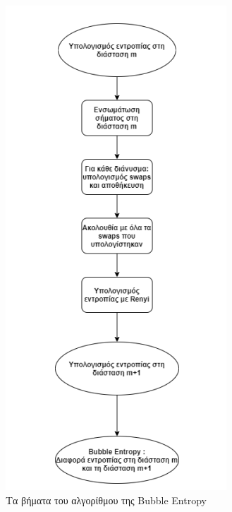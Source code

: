 \begin{figure}[!ht]
	\centering
	\includegraphics[scale = 0.5]{Bubble2.png}    
	\caption{Τα βήματα του αλγορίθμου της \en Bubble Entropy\gr }
\end{figure}

